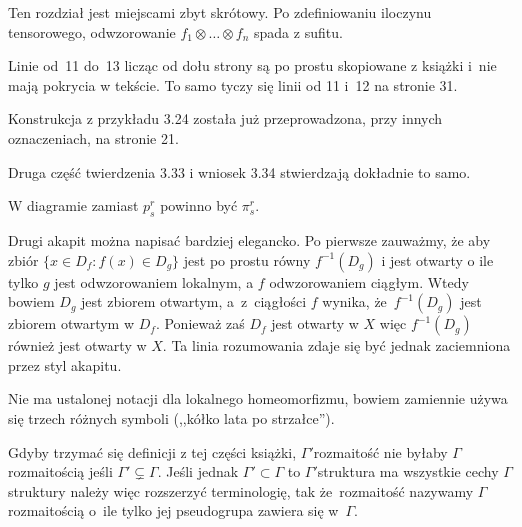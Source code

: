 \documentclass[a4paper,11pt]{article}
\begin{document}
\start {} Ten rozdział jest miejscami zbyt skrótowy. Po
zdefiniowaniu iloczynu tensorowego, odwzorowanie
$f_{ 1 } \otimes \ldots \otimes f_{ n }$ spada z sufitu.

\vspace{\spaceFour}


\start {} Linie od~11 do~13 licząc od dołu strony są po prostu
skopiowane z książki \cite{Gan04} i~nie mają pokrycia w tekście. To
samo tyczy się linii od 11 i~12 na stronie 31.

\vspace{\spaceFour}


\start {} Konstrukcja z przykładu 3.24 została już
przeprowadzona, przy innych oznaczeniach, na stronie 21.

\vspace{\spaceFour}


\start {} Druga część twierdzenia 3.33 i wniosek 3.34
stwierdzają dokładnie to samo.

\vspace{\spaceFour}


\start {} W diagramie zamiast $p^{ r }_{ s }$ powinno być
$\pi^{ r }_{ s }$.

\vspace{\spaceFour}


\start {} Drugi akapit można napisać bardziej elegancko. Po
pierwsze zauważmy, że aby zbiór\linebreak
$\{ x \in D_{ f } : f( x ) \in D_{ g } \}$ jest po prostu równy
$f^{ -1 }( D_{ g } )$ i jest otwarty o ile tylko $g$ jest
odwzorowaniem lokalnym, a $f$ odwzorowaniem ciągłym. Wtedy bowiem
$D_{ g }$ jest zbiorem otwartym, a~z~ciągłości $f$ wynika,
że~$f^{ -1 }( D_{ g } )$ jest zbiorem otwartym w $D_{ f }$. Ponieważ
zaś $D_{ f }$ jest otwarty w $X$ więc $f^{ -1 }( D_{ g } )$ również
jest otwarty w $X$. Ta linia rozumowania zdaje się być jednak
zaciemniona przez styl akapitu.

\vspace{\spaceFour}


\start {} Nie ma ustalonej notacji dla lokalnego homeomorfizmu,
bowiem zamiennie używa się trzech różnych symboli (,,kółko lata po
strzałce'').

\vspace{\spaceFour}


\start {} Gdyby trzymać się definicji z tej części książki,
$\Gamma'$\dywiz rozmaitość nie byłaby $\Gamma$\dywiz rozmaitością
jeśli $\Gamma' \subsetneq \Gamma$. Jeśli jednak
$\Gamma' \subset \Gamma$ to $\Gamma'$\dywiz struktura ma wszystkie
cechy $\Gamma$\dywiz struktury należy więc rozszerzyć terminologię,
tak że~rozmaitość nazywamy $\Gamma$\dywiz rozmaitością o~ile tylko jej
pseudogrupa zawiera się w~$\Gamma$.
\end{document}
